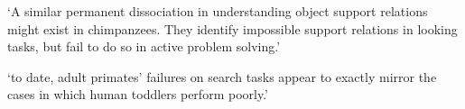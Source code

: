 \documentclass[12pt]{extarticle}
\begin{document}
\begin{multicols}{3}
‘A similar permanent dissociation in understanding object support relations might exist in chimpanzees. They identify impossible support relations in looking tasks, but fail to do so in active problem solving.’
\citep{gomez:2005_species}
 
‘to date, adult primates’ failures on search tasks appear to exactly mirror the cases in which human toddlers perform poorly.’
\citep[p.\ 17]{santos:2009_object}
 
 
 
 
\footnotesize 


\end{multicols}
\end{document}
